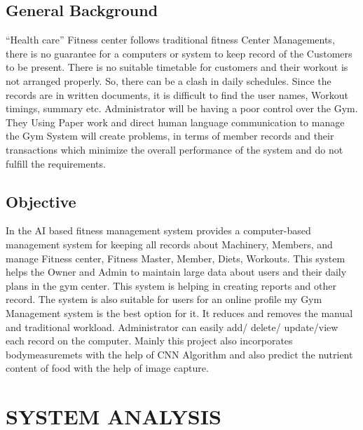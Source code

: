\documentclass[a4paper,12pt,toc=flat]{report}
\begin{document}
	\section{General Background}
	
	
	
	\hspace*{12pt}“Health care” Fitness center follows traditional fitness Center Managements, there is no guarantee for a computers or system to keep record of the Customers to be present. There is no suitable timetable for customers  and their workout is not arranged properly. So, there can be a clash in daily schedules. Since the records are in written documents, it is difficult to find the user names, Workout timings, summary etc. Administrator will be having a poor control over the Gym. They Using Paper work and direct human language communication to manage the Gym System will create problems, in terms of member records and their transactions which minimize the overall performance of the system and do not fulfill the requirements.  \\
	
	\pagebreak
	
	\section{Objective}
	\hspace*{12pt}In the AI based fitness management system provides a computer-based management system for keeping all records about Machinery, Members, and manage Fitness center, Fitness Master, Member, Diets, Workouts. This system helps the Owner and Admin to maintain large data about users and their daily plans in the gym center. This system is helping in creating reports and other record. The system is also suitable for users for an online profile my Gym Management system is the best option for it. It reduces and removes the manual and traditional workload. Administrator can easily add/ delete/ update/view each record on the computer. Mainly this project also incorporates bodymeasuremets with the help of CNN Algorithm and also predict the nutrient content of food with the help of image capture.  
	
	
	
	\hspace*{12pt}
	\pagebreak
	
	\chapter{\centering \bf \Large \hspace*{}SYSTEM ANALYSIS}
        \\
        \\
	\\
	\\
	\\
		
\end{document}
